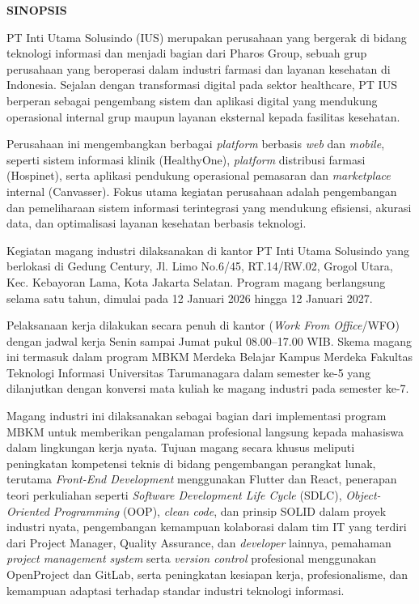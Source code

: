 \documentclass[12pt, a4paper]{article}
\begin{document}
\makeatletter
\begin{center}
    \large\textbf{\@title}
\end{center}

\makeatother

{\noindent\large\textbf{SINOPSIS}\\}

PT Inti Utama Solusindo (IUS) merupakan perusahaan yang bergerak di bidang
teknologi informasi dan menjadi bagian dari Pharos Group, sebuah grup
perusahaan yang beroperasi dalam industri farmasi dan layanan kesehatan di
Indonesia. Sejalan dengan transformasi digital pada sektor healthcare, PT IUS
berperan sebagai pengembang sistem dan aplikasi digital yang mendukung
operasional internal grup maupun layanan eksternal kepada fasilitas kesehatan.

Perusahaan ini mengembangkan berbagai \textit{platform} berbasis \textit{web}
dan \textit{mobile}, seperti sistem informasi klinik (HealthyOne),
\textit{platform} distribusi farmasi (Hospinet), serta aplikasi pendukung
operasional pemasaran dan \textit{marketplace} internal (Canvasser). Fokus
utama kegiatan perusahaan adalah pengembangan dan pemeliharaan sistem informasi
terintegrasi yang mendukung efisiensi, akurasi data, dan optimalisasi layanan
kesehatan berbasis teknologi.

Kegiatan magang industri dilaksanakan di kantor PT Inti Utama Solusindo yang
berlokasi di Gedung Century, Jl. Limo No.6/45, RT.14/RW.02, Grogol Utara, Kec.
Kebayoran Lama, Kota Jakarta Selatan. Program magang berlangsung selama satu
tahun, dimulai pada 12 Januari 2026 hingga 12 Januari 2027.

Pelaksanaan kerja dilakukan secara penuh di kantor (\textit{Work From
    Office}/WFO) dengan jadwal kerja Senin sampai Jumat pukul 08.00–17.00 WIB.
Skema magang ini termasuk dalam program MBKM Merdeka Belajar Kampus Merdeka
Fakultas Teknologi Informasi Universitas Tarumanagara dalam semester ke-5 yang
dilanjutkan dengan konversi mata kuliah ke magang industri pada semester ke-7.

Magang industri ini dilaksanakan sebagai bagian dari implementasi program MBKM
untuk memberikan pengalaman profesional langsung kepada mahasiswa dalam
lingkungan kerja nyata. Tujuan magang secara khusus meliputi peningkatan
kompetensi teknis di bidang pengembangan perangkat lunak, terutama
\textit{Front-End Development} menggunakan Flutter dan React, penerapan teori
perkuliahan seperti \textit{Software Development Life Cycle} (SDLC),
\textit{Object-Oriented Programming} (OOP), \textit{clean code}, dan prinsip
SOLID dalam proyek industri nyata, pengembangan kemampuan kolaborasi dalam tim
IT yang terdiri dari Project Manager, Quality Assurance, dan \textit{developer}
lainnya, pemahaman \textit{project management system} serta \textit{version
    control} profesional menggunakan OpenProject dan GitLab, serta peningkatan
kesiapan kerja, profesionalisme, dan kemampuan adaptasi terhadap standar
industri teknologi informasi.
\end{document}
